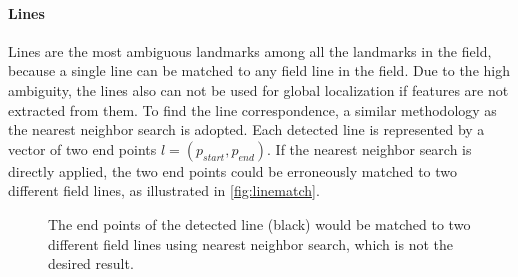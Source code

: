 \paragraph{Lines}
Lines are the most ambiguous landmarks among all the landmarks in the field, because a single line can be matched to any field line in the field. Due to the high ambiguity, the lines also can not be used for global localization if features are not extracted from them. To find the line correspondence, a similar methodology as the nearest neighbor search is adopted. Each detected line is represented by a vector of two end points $l=(p_{start}, p_{end})$. If the nearest neighbor search is directly applied, the two end points could be erroneously matched to two different field lines, as illustrated in \autoref{fig:linematch}.

\begin{figure}[h!]
\centering
{}
  \caption[Matching of end points of the detected line]{The end points of the detected line (black) would be matched to two different field lines using nearest neighbor search, which is not the desired result.}
\label{fig:linematch}
\end{figure}

